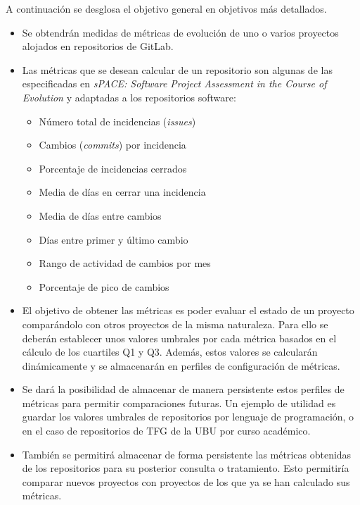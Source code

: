 A continuación se desglosa el objetivo general  en objetivos más detallados.
\begin{itemize}
	\tightlist
	\item Se obtendrán medidas de métricas de evolución de uno o varios proyectos alojados en repositorios de GitLab.
	\item Las métricas que se desean calcular de un repositorio  son algunas de las especificadas en \textit{sPACE: Software Project Assessment in the Course of Evolution} \citep{ratzinger_space:_2007} y 
	adaptadas a los repositorios software:
	\begin{itemize}
		\tightlist
		\item Número total de incidencias (\textit{issues})
		\item Cambios (\textit{commits}) por incidencia
		\item Porcentaje de incidencias cerrados
		\item Media de días en cerrar una incidencia
		\item Media de días entre cambios
		\item Días entre primer y último cambio
		\item Rango de actividad de cambios por mes
		\item Porcentaje de pico de cambios
	\end{itemize}
	\item El objetivo de obtener las métricas es poder evaluar el estado de un proyecto comparándolo con otros proyectos de la misma naturaleza. Para ello se deberán establecer unos valores umbrales por cada métrica basados en el cálculo de los cuartiles Q1 y Q3. Además, estos valores se calcularán dinámicamente y se almacenarán en perfiles de configuración de métricas.
	\item Se dará la posibilidad de almacenar de manera persistente estos perfiles de métricas para permitir comparaciones futuras. Un ejemplo de utilidad es guardar los valores umbrales de repositorios por lenguaje de programación, o en el caso de repositorios de TFG de la UBU por curso académico.
	\item También se permitirá almacenar de forma persistente las métricas obtenidas de los repositorios para su posterior consulta o tratamiento. Esto permitiría comparar nuevos proyectos con proyectos de los que ya se han calculado sus métricas.
\end{itemize}

